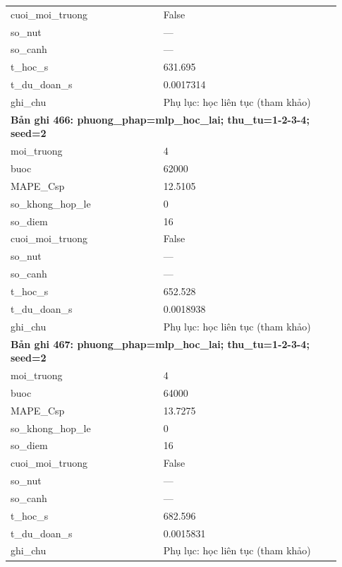 \begin{longtable}{p{0.43\linewidth}p{0.50\linewidth}}
cuoi\_\allowbreak moi\_\allowbreak truong & False \\
so\_\allowbreak nut & — \\
so\_\allowbreak canh & — \\
t\_\allowbreak hoc\_\allowbreak s & 631.695 \\
t\_\allowbreak du\_\allowbreak doan\_\allowbreak s & 0.0017314 \\
ghi\_\allowbreak chu & Phụ lục: học liên tục (tham khảo) \\
\midrule
\multicolumn{2}{p{0.95\linewidth}}{\textbf{Bản ghi 466: phuong\_phap=mlp\_hoc\_lai; thu\_tu=1-2-3-4; seed=2}} \\
moi\_\allowbreak truong & 4 \\
buoc & 62000 \\
MAPE\_\allowbreak Csp & 12.5105 \\
so\_\allowbreak khong\_\allowbreak hop\_\allowbreak le & 0 \\
so\_\allowbreak diem & 16 \\
cuoi\_\allowbreak moi\_\allowbreak truong & False \\
so\_\allowbreak nut & — \\
so\_\allowbreak canh & — \\
t\_\allowbreak hoc\_\allowbreak s & 652.528 \\
t\_\allowbreak du\_\allowbreak doan\_\allowbreak s & 0.0018938 \\
ghi\_\allowbreak chu & Phụ lục: học liên tục (tham khảo) \\
\midrule
\multicolumn{2}{p{0.95\linewidth}}{\textbf{Bản ghi 467: phuong\_phap=mlp\_hoc\_lai; thu\_tu=1-2-3-4; seed=2}} \\
moi\_\allowbreak truong & 4 \\
buoc & 64000 \\
MAPE\_\allowbreak Csp & 13.7275 \\
so\_\allowbreak khong\_\allowbreak hop\_\allowbreak le & 0 \\
so\_\allowbreak diem & 16 \\
cuoi\_\allowbreak moi\_\allowbreak truong & False \\
so\_\allowbreak nut & — \\
so\_\allowbreak canh & — \\
t\_\allowbreak hoc\_\allowbreak s & 682.596 \\
t\_\allowbreak du\_\allowbreak doan\_\allowbreak s & 0.0015831 \\
ghi\_\allowbreak chu & Phụ lục: học liên tục (tham khảo) \\

\end{longtable}

